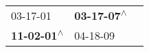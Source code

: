 \begin{supertabular}{lll}
                  03-17-01\textsuperscript{} &  \textbf{03-17-07\textsuperscript{$\wedge$}} \\
 \textbf{11-02-01\textsuperscript{$\wedge$}} &                   04-18-09\textsuperscript{} \\
\end{supertabular}
